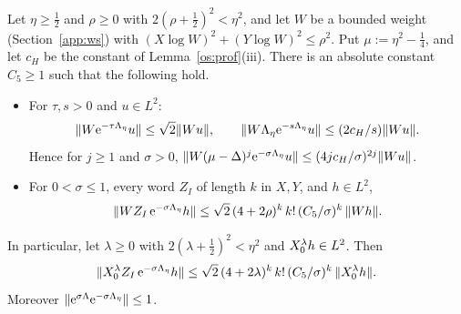 \begin{lemma}\label{os:words}
Let $\eta\ge\tfrac12$ and $\rho\ge0$ with $2(\rho+\tfrac12)^2<\eta^2$, and let $W$ be a bounded weight (Section~\ref{app:ws}) with
$(X\log W)^2+(Y\log W)^2\le\rho^2$. Put $\mu:=\eta^2-\tfrac14$, and let $c_H$ be the constant of Lemma~\ref{os:prof}(iii). There is an
absolute constant $C_5\ge1$ such that the following hold.
\begin{itemize}
\item[(a)] For $\tau,s>0$ and $u\in L^2$:
\[
\lVert W\mathrm{e}^{-\tau\Lambda_\eta}u\rVert\le\sqrt2\lVert Wu\rVert,\qquad
\lVert W\Lambda_\eta\mathrm{e}^{-s\Lambda_\eta}u\rVert\le(2c_H/s)\lVert Wu\rVert.
\]
Hence for $j\ge1$ and $\sigma>0$, $\lVert W(\mu-\Delta)^j\mathrm{e}^{-\sigma\Lambda_\eta}u\rVert\le(4jc_H/\sigma)^{2j}\lVert Wu\rVert$.
\item[(b)] For $0<\sigma\le1$, every word $Z_I$ of length $k$ in $X,Y$, and $h\in L^2$,
\[
\lVert WZ_I\,\mathrm{e}^{-\sigma\Lambda_\eta}h\rVert\le\sqrt2\,(4+2\rho)^k\,k!\,(C_5/\sigma)^k\,\lVert Wh\rVert.
\]
\end{itemize}
In particular, let $\lambda\ge0$ with $2(\lambda+\tfrac12)^2<\eta^2$ and $X_0^\lambda h\in L^2$. Then
\[
\lVert X_0^\lambda Z_I\,\mathrm{e}^{-\sigma\Lambda_\eta}h\rVert\le\sqrt2\,(4+2\lambda)^k\,k!\,(C_5/\sigma)^k\,\lVert X_0^\lambda h\rVert.
\]
Moreover $\lVert \mathrm{e}^{\sigma\Lambda}\mathrm{e}^{-\sigma\Lambda_\eta}\rVert\le1$.
\end{lemma}
